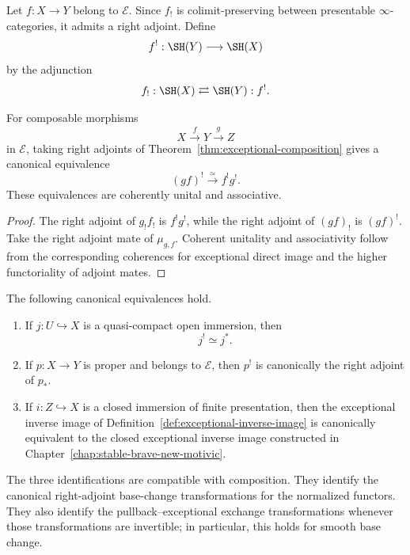 \begin{definition}
\label{def:exceptional-inverse-image}
Let \(f:X\to Y\) belong to \(\mathcal E\).  Since \(f_!\) is
colimit-preserving between presentable \(\infty\)-categories, it admits a
right adjoint.  Define
\[
    f^!:\SH(Y)\longrightarrow\SH(X)
\]
by the adjunction
\[
    f_!:\SH(X)
    \rightleftarrows
    \SH(Y):f^!.
\]
\end{definition}

\begin{proposition}
\label{prop:exceptional-inverse-composition}
For composable morphisms
\[
    X\xrightarrow{f}Y\xrightarrow{g}Z
\]
in \(\mathcal E\), taking right adjoints of
Theorem~\ref{thm:exceptional-composition} gives a canonical equivalence
\[
    (gf)^!
    \xrightarrow{\simeq}
    f^!g^!.
\]
These equivalences are coherently unital and associative.
\end{proposition}

\begin{proof}
The right adjoint of \(g_!f_!\) is \(f^!g^!\), while the right adjoint of
\((gf)_!\) is \((gf)^!\).  Take the right adjoint mate of
\(\mu_{g,f}\).  Coherent unitality and associativity follow from the
corresponding coherences for exceptional direct image and the higher
functoriality of adjoint mates.
\end{proof}

\begin{proposition}
\label{prop:exceptional-inverse-normalization}
The following canonical equivalences hold.

\begin{enumerate}
    \item If \(j:U\hookrightarrow X\) is a quasi-compact open immersion,
    then
    \[
        j^!\simeq j^*.
    \]

    \item If \(p:X\to Y\) is proper and belongs to \(\mathcal E\), then
    \(p^!\) is canonically the right adjoint of \(p_*\).

    \item If \(i:Z\hookrightarrow X\) is a closed immersion of finite
    presentation, then the exceptional inverse image of
    Definition~\ref{def:exceptional-inverse-image} is canonically
    equivalent to the closed exceptional inverse image constructed in
    Chapter~\ref{chap:stable-brave-new-motivic}.
\end{enumerate}

The three identifications are compatible with composition.  They identify
the canonical right-adjoint base-change transformations for the normalized
functors.  They also identify the pullback--exceptional exchange
transformations whenever those transformations are invertible; in
particular, this holds for smooth base change.
\end{proposition}

